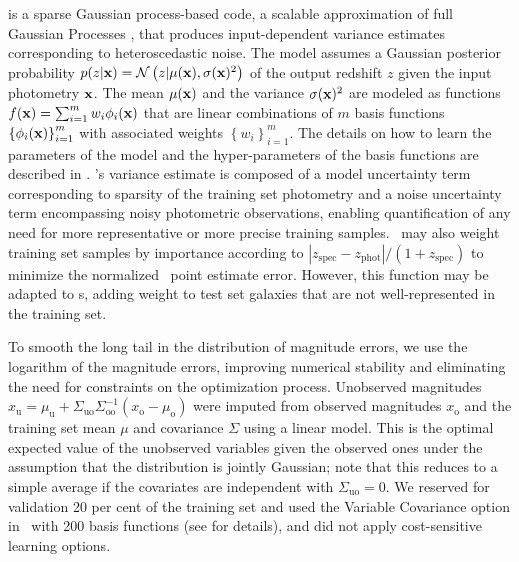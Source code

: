 \gpz \citep{Almosallam:16a,Almosallam:15b} is a sparse Gaussian process-based code, a scalable approximation of full Gaussian Processes \citep{Rasmussen:06}, that produces input-dependent variance estimates corresponding to heteroscedastic noise.
The model assumes a Gaussian posterior probability $p(z \vert {\mathbf{x}}) = \mathcal{N}\left(z \vert \mu({\mathbf{x}}), \sigma({\mathbf{x}})^{2}\right)$ of the output redshift $z$ given the input photometry ${\mathbf{x}}$.
The mean $\mu({\mathbf{x}})$ and the variance $\sigma({\mathbf{x}})^{2}$ are modeled as functions $f({\mathbf{x}}) = \sum_{i=1}^{m}w_{i}\phi_{i}({\mathbf{x}})$ that are linear combinations of $m$ basis functions $\left\{\phi_{i}({\mathbf{x}})\right\}_{i=1}^{m}$ with associated weights $\left\{w_{i}\right\}_{i=1}^{m}$.
The details on how to learn the parameters of the model and the hyper-parameters of the basis functions are described in \citet{Almosallam:15b}.
\gpz's variance estimate is composed of a model uncertainty term corresponding to sparsity of the training set photometry and a noise uncertainty term encompassing noisy photometric observations, enabling quantification of any need for more representative or more precise training samples.
\gpz\ may also weight training set samples by importance according to $|z_{\mathrm{spec}} - z_{\mathrm{phot}}| / (1+z_{\mathrm{spec}})$ to minimize the normalized \pz\ point estimate error.  However, this function may be adapted to \pzpdf s, adding weight to test set galaxies that are not well-represented in the training set.

To smooth the long tail in the distribution of magnitude errors, we use the logarithm of the magnitude errors, improving numerical stability and eliminating the need for constraints on the optimization process.
Unobserved magnitudes $x_{\mathrm{u}} = \mu_{\mathrm{u}} + \Sigma_{\mathrm{uo}}\Sigma_{\mathrm{oo}}^{-1}(x_{\mathrm{o}} - \mu_{\mathrm{o}})$ were imputed from observed magnitudes $x_{\mathrm{o}}$ and the training set mean $\mu$ and covariance $\Sigma$ using a linear model.
This is the optimal expected value of the unobserved variables given the observed ones under the assumption that the distribution is jointly Gaussian; note that this reduces to a simple average if the covariates are independent with $\Sigma_{\mathrm{uo}} = 0$.
We reserved for validation 20 per cent of the training set and used the Variable Covariance option in \gpz\ with 200 basis functions (see \citet{Almosallam:15b} for details), and did not apply cost-sensitive learning options.


